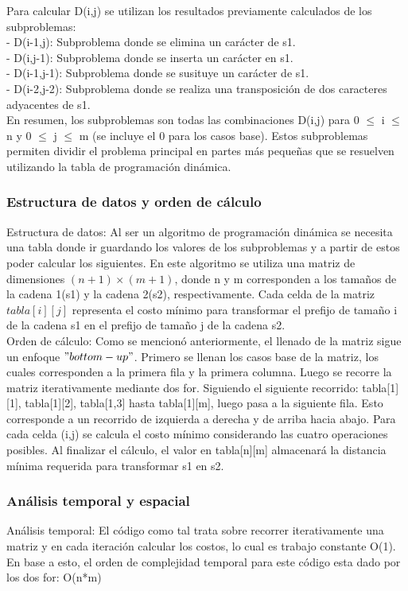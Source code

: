 Para calcular D(i,j) se utilizan los resultados previamente calculados de los subproblemas:\\
- D(i-1,j): Subproblema donde se elimina un carácter de s1.\\
- D(i,j-1): Subproblema donde se inserta un carácter en s1.\\
- D(i-1,j-1): Subproblema donde se susituye un carácter de s1.\\
- D(i-2,j-2): Subproblema donde se realiza una transposición de dos caracteres adyacentes de s1.\\
En resumen, los subproblemas son todas las combinaciones D(i,j) para 0 $\leq$ i $\leq$ n y 0 $\leq$ j $\leq$ m (se incluye el 0 para los casos base). Estos subproblemas permiten dividir el problema principal en partes más pequeñas que se resuelven utilizando la tabla de programación dinámica.
\subsubsection{Estructura de datos y orden de cálculo}
Estructura de datos: Al ser un algoritmo de programación dinámica se necesita una tabla donde  ir guardando los valores de los subproblemas y a partir de estos poder calcular los siguientes. En este algoritmo se utiliza una matriz de dimensiones $(n+1) \times (m+1)$, donde n y m corresponden a los tamaños de la cadena 1(s1) y la cadena 2(s2), respectivamente.
Cada celda de la matriz $tabla[i][j]$ representa el costo mínimo para transformar el prefijo de tamaño i de la cadena s1 en el prefijo de tamaño j de la cadena s2.\\

Orden de cálculo: Como se mencionó anteriormente, el llenado de la matriz sigue un enfoque $"bottom-up"$. 
Primero se llenan los casos base de la matriz, los cuales corresponden a la primera fila y la primera columna.
Luego se recorre la matriz iterativamente mediante dos for. Siguiendo el siguiente recorrido:
tabla[1][1], tabla[1][2], tabla[1,3] hasta tabla[1][m], luego pasa a la siguiente fila. Esto corresponde a un recorrido de izquierda a derecha y de arriba hacia abajo. Para cada celda (i,j) se calcula el costo mínimo considerando las cuatro operaciones posibles.
Al finalizar el cálculo, el valor en tabla[n][m] almacenará la distancia mínima requerida para transformar s1 en s2.

\subsubsection{Análisis temporal y espacial}
Análisis temporal: El código como tal trata sobre recorrer iterativamente una matriz y en cada iteración calcular los costos, lo cual es trabajo constante O(1). En base a esto, el orden de complejidad temporal para este código esta dado por los dos for: O(n*m)

